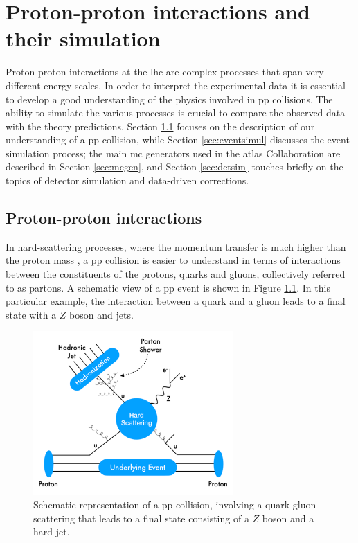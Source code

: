 \chapter{Proton-proton interactions and their simulation}
\label{chap:event:MC}

Proton-proton interactions at the \gls{lhc} are complex processes that span very different energy scales. 
In order to interpret the experimental data it is essential to develop a good understanding of the physics involved in \gls{pp} collisions. 
The ability to simulate the various processes is crucial to compare the observed data with the theory predictions.
Section \ref{sec:ppint} focuses on the description of our understanding of a \gls{pp} collision, while Section \ref{sec:eventsimul} 
discusses the event-simulation process; 
the main \gls{mc} generators used in the \gls{atlas} Collaboration are described in Section \ref{sec:mcgen}, and Section \ref{sec:detsim} touches briefly on the topics of detector simulation and data-driven corrections.



\section{Proton-proton interactions}
\label{sec:ppint}

In hard-scattering processes, where the momentum transfer is much higher than the proton mass \cite{Butterworth:2012fj}, 
a \gls{pp} collision is easier to understand in terms of interactions between the constituents of the protons, quarks and gluons, 
collectively referred to as partons. A schematic view of a \gls{pp} event is shown in Figure \ref{fig:sim:pp2}. In this particular example, the interaction between a quark and a gluon leads to a final state with a $Z$ boson and jets. 

\begin{figure}[h]
\begin{center}
    \includegraphics[width=0.68\textwidth]{figures/Chap4/Rizzi-Fig4-1-1.pdf}
\end{center}
 \caption{Schematic representation of a \gls{pp} collision, involving a quark-gluon scattering that leads to a final state consisting of a $Z$ boson and a hard jet.}
  \label{fig:sim:pp2}
\end{figure}

